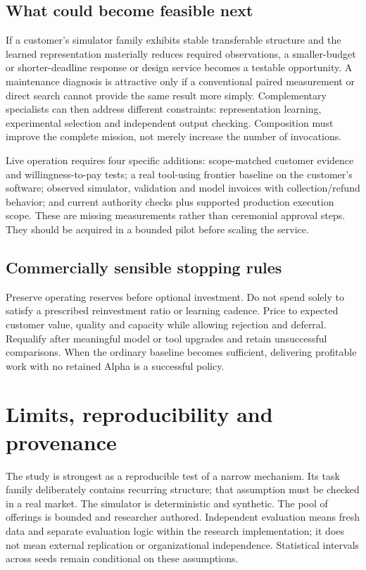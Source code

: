 \documentclass[11pt,letterpaper]{article}
\begin{document}
\subsection{What could become feasible next}

If a customer's simulator family exhibits stable transferable structure and the learned representation materially reduces required observations, a smaller-budget or shorter-deadline response or design service becomes a testable opportunity. A maintenance diagnosis is attractive only if a conventional paired measurement or direct search cannot provide the same result more simply. Complementary specialists can then address different constraints: representation learning, experimental selection and independent output checking. Composition must improve the complete mission, not merely increase the number of invocations.

Live operation requires four specific additions: scope-matched customer evidence and willingness-to-pay tests; a real tool-using frontier baseline on the customer's software; observed simulator, validation and model invoices with collection/refund behavior; and current authority checks plus supported production execution scope. These are missing measurements rather than ceremonial approval steps. They should be acquired in a bounded pilot before scaling the service.

\subsection{Commercially sensible stopping rules}

Preserve operating reserves before optional investment. Do not spend solely to satisfy a prescribed reinvestment ratio or learning cadence. Price to expected customer value, quality and capacity while allowing rejection and deferral. Requalify after meaningful model or tool upgrades and retain unsuccessful comparisons. When the ordinary baseline becomes sufficient, delivering profitable work with no retained Alpha is a successful policy.

\section{Limits, reproducibility and provenance}

The study is strongest as a reproducible test of a narrow mechanism. Its task family deliberately contains recurring structure; that assumption must be checked in a real market. The simulator is deterministic and synthetic. The pool of offerings is bounded and researcher authored. Independent evaluation means fresh data and separate evaluation logic within the research implementation; it does not mean external replication or organizational independence. Statistical intervals across seeds remain conditional on these assumptions.
\end{document}
